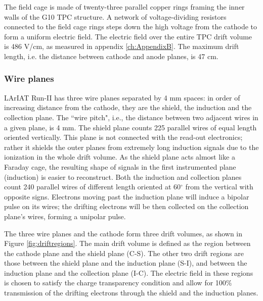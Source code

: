 The field cage is made of twenty-three parallel copper rings framing the inner walls of the G10 TPC structure. A network of voltage-dividing resistors connected to the field cage rings steps down the high voltage from the cathode to form a uniform electric field. The electric field over the entire TPC drift volume is  486 V/cm, as measured in appendix \ref{ch:AppendixB}. The  maximum drift length, i.e. the distance between cathode and anode planes, is 47 cm.

\subsubsection{Wire planes}
LArIAT Run-II has three wire planes separated by 4 mm spaces: in order of increasing distance from the cathode, they are the shield, the induction and the collection plane. The ``wire pitch", i.e., the distance between two adjacent wires in a given plane, is 4 mm.  The shield plane counts 225 parallel wires of equal length oriented vertically. This plane is not connected with the read-out electronics; rather it shields the outer planes from extremely long induction signals due to the ionization in the whole drift volume. As the shield plane acts almost like a Faraday cage, the resulting shape of signals in the first instrumented plane (induction) is easier to reconstruct.  Both the induction and collection planes count 240 parallel wires of different length oriented at 60$^\circ$ from the vertical with opposite signs.
Electrons moving past the induction plane will induce a bipolar pulse on its wires; the drifting electrons will be then collected on the collection plane's wires, forming a unipolar pulse. 

The three wire planes and the cathode form three drift volumes, as shown in Figure \ref{fig:driftregions}. 
The main drift volume is defined as the region between the cathode plane and the shield plane (C-S). The other two drift regions are those between the shield plane and the induction plane (S-I), and between the induction plane and the collection plane (I-C). The electric field in these regions is chosen to satisfy the charge transparency condition and allow for 100$\%$ transmission of the drifting electrons through the shield and the induction planes. 

